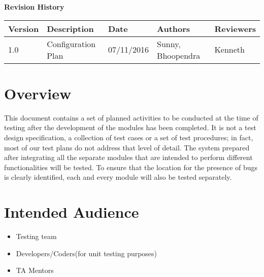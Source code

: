 \documentclass[12pt]{article}
\begin{document}
	\textbf{Revision History}
	\begin{center}
		\begin{tabular}{ | m{3em} | m{8em} | m{5em} | m{4em} | m{4em} | }
			\hline
			Version & Description & Date       & Authors            & Reviewers \\
			\hline
			1.0     & Configuration Plan    & 07/11/2016 & Sunny, Bhoopendra & Kenneth  \\ 

			\hline
		
		\end{tabular}
	\end{center}
	
	\newpage
	\tableofcontents
	
	\newpage
\section{Overview}
This document contains a set of planned activities to be conducted at the time of testing after the development of the modules has been completed. It is not a test design specification, a collection of test cases or a set of test procedures; in fact, most of our test plans do not address that level of detail. The system prepared after integrating all the separate modules that are intended to perform different functionalities will be tested. To ensure that the location for the presence of bugs is clearly identified, each and every module will also be tested separately.
\section{Intended Audience}
\begin{itemize}
    \item Testing team
    \item Developers/Coders(for unit testing purposes)
    \item TA Mentors
\end{itemize}
\end{document}

